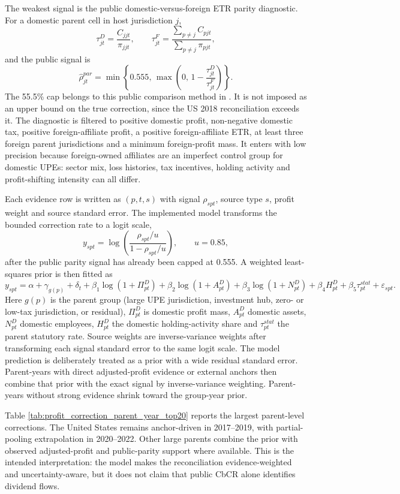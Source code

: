 \documentclass[11pt,a4paper]{article}
\begin{document}
The weakest signal is the public domestic-versus-foreign ETR parity diagnostic. For a domestic parent cell in host jurisdiction $j$,
\[
\tau^{D}_{jt}=\frac{C_{jjt}}{\pi_{jjt}},
\qquad
\tau^{F}_{jt}=
\frac{\sum_{p\neq j} C_{pjt}}
{\sum_{p\neq j} \pi_{pjt}},
\]
and the public signal is
\[
\widehat{\rho}^{par}_{jt}
=
\min\left\{0.555,\,
\max\left(0,\,1-\frac{\tau^{D}_{jt}}{\tau^{F}_{jt}}\right)\right\}.
\]
The 55.5\% cap belongs to this public comparison method in \citet{hugger2026}. It is not imposed as an upper bound on the true correction, since the US 2018 reconciliation exceeds it. The diagnostic is filtered to positive domestic profit, non-negative domestic tax, positive foreign-affiliate profit, a positive foreign-affiliate ETR, at least three foreign parent jurisdictions and a minimum foreign-profit mass. It enters with low precision because foreign-owned affiliates are an imperfect control group for domestic UPEs: sector mix, loss histories, tax incentives, holding activity and profit-shifting intensity can all differ.



Each evidence row is written as $(p,t,s)$ with signal $\rho_{spt}$, source type $s$, profit weight and source standard error. The implemented model transforms the bounded correction rate to a logit scale,
\[
y_{spt}
=
\log\left(
\frac{\rho_{spt}/u}{1-\rho_{spt}/u}
\right),
\qquad u=0.85 ,
\]
after the public parity signal has already been capped at 0.555. A weighted least-squares prior is then fitted as
\[
y_{spt}
=
\alpha+\gamma_{g(p)}+\delta_t
+\beta_1\log(1+\Pi^D_{pt})
+\beta_2\log(1+A^D_{pt})
+\beta_3\log(1+N^D_{pt})
+\beta_4 H^D_{pt}
+\beta_5 \tau^{stat}_{pt}
+\varepsilon_{spt}.
\]
Here $g(p)$ is the parent group (large UPE jurisdiction, investment hub, zero- or low-tax jurisdiction, or residual), $\Pi^D_{pt}$ is domestic profit mass, $A^D_{pt}$ domestic assets, $N^D_{pt}$ domestic employees, $H^D_{pt}$ the domestic holding-activity share and $\tau^{stat}_{pt}$ the parent statutory rate. Source weights are inverse-variance weights after transforming each signal standard error to the same logit scale. The model prediction is deliberately treated as a prior with a wide residual standard error. Parent-years with direct adjusted-profit evidence or external anchors then combine that prior with the exact signal by inverse-variance weighting. Parent-years without strong evidence shrink toward the group-year prior.

Table \ref{tab:profit_correction_parent_year_top20} reports the largest parent-level corrections. The United States remains anchor-driven in 2017--2019, with partial-pooling extrapolation in 2020--2022. Other large parents combine the \citet{hugger2026} prior with observed adjusted-profit and public-parity support where available. This is the intended interpretation: the model makes the reconciliation evidence-weighted and uncertainty-aware, but it does not claim that public CbCR alone identifies dividend flows.
\end{document}
